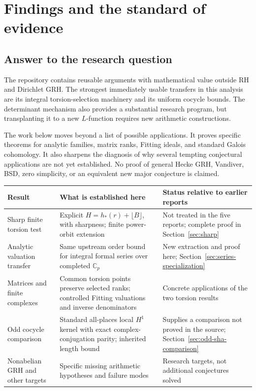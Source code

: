 \documentclass[11pt,letterpaper]{article}
\theoremstyle{remark}
\newcommand{\C}{\mathbb C}
\begin{document}
\section{Findings and the standard of evidence}
\label{sec:findings}

\subsection{Answer to the research question}

The repository contains reusable arguments with mathematical value outside
RH and Dirichlet GRH. The strongest immediately usable transfers in this
analysis are its integral torsion-selection machinery and its uniform
cocycle bounds. The determinant mechanism also provides a substantial
research program, but transplanting it to a new $L$-function requires new
arithmetic constructions.

The work below moves beyond a list of possible applications. It proves
specific theorems for analytic families, matrix ranks, Fitting ideals, and
standard Galois cohomology. It also sharpens the diagnosis of why several
tempting conjectural applications are not yet established. No proof of
general Hecke GRH, Vandiver, BSD, zero simplicity, or an equivalent new
major conjecture is claimed.

\begin{center}
\small
\begin{tabularx}{\textwidth}{>{\raggedright\arraybackslash}p{}YY}
\toprule
Result & What is established here & Status relative to earlier reports\\
\midrule
Sharp finite torsion test & Explicit $H=h_*(r)+\lfloor B\rfloor$, with
sharpness; finite power-orbit extension & Not treated in the five reports;
complete proof in Section~\ref{sec:sharp}\\
Analytic valuation transfer & Same upstream order bound for integral formal
series over completed $\C_p$ & New extraction and proof here;
Section~\ref{sec:series-specialization}\\
Matrices and finite complexes & Common torsion points preserve selected
ranks; controlled Fitting valuations and inverse denominators & Concrete
applications of the two torsion results\\
Odd cocycle comparison & Standard all-places local $H^1$ kernel with exact
complex-conjugation parity; inherited length bound & Supplies a comparison
not proved in the source; Section~\ref{sec:odd-sha-comparison}\\
Nonabelian GRH and other targets & Specific missing arithmetic hypotheses
and failure modes & Research targets, not additional conjectures solved\\
\bottomrule
\end{tabularx}
\end{center}
\end{document}
